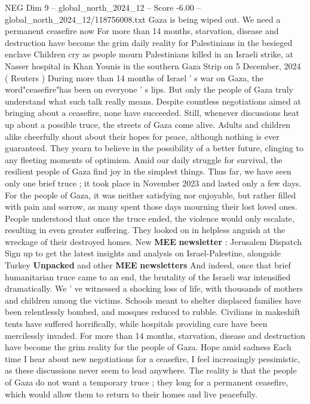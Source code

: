 \begin{textsample}{NEG Dim 9 – global\_north\_2024\_12 – Score -6.00 – global\_north\_2024\_12/118756008.txt}  \label{ex:f9_neg_122}
Gaza is being wiped out.
We need a permanent ceasefire now For more than 14 months, starvation, disease and destruction have become the grim daily reality for Palestinians in the besieged enclave Children cry as people mourn Palestinians killed in an Israeli strike, at Nasser hospital in Khan Younis in the southern Gaza Strip on 5 December, 2024 ( Reuters ) During more than 14 months of Israel ' s war on Gaza, the word"ceasefire"has been on everyone ' s lips.
But only the people of Gaza truly understand what such talk really means.
Despite countless negotiations aimed at bringing about a ceasefire, none have succeeded.
Still, whenever discussions heat up about a possible truce, the streets of Gaza come alive.
Adults and children alike cheerfully shout about their hopes for peace, although nothing is ever guaranteed.
They yearn to believe in the possibility of a better future, clinging to any fleeting moments of optimism.
Amid our daily struggle for survival, the resilient people of Gaza find joy in the simplest things.
Thus far, we have seen only one brief truce ; it took place in November 2023 and lasted only a few days.
For the people of Gaza, it was neither satisfying nor enjoyable, but rather filled with pain and sorrow, as many spent those days mourning their lost loved ones.
People understood that once the truce ended, the violence would only escalate, resulting in even greater suffering.
They looked on in helpless anguish at the wreckage of their destroyed homes.
New \textbf{MEE} \textbf{newsletter} : Jerusalem Dispatch Sign up to get the latest insights and analysis on Israel-Palestine, alongside Turkey \textbf{Unpacked} and other \textbf{MEE} \textbf{newsletters} And indeed, once that brief humanitarian truce came to an end, the brutality of the Israeli war intensified dramatically.
We ' ve witnessed a shocking loss of life, with thousands of mothers and children among the victims.
Schools meant to shelter displaced families have been relentlessly bombed, and mosques reduced to rubble.
Civilians in makeshift tents have suffered horrifically, while hospitals providing care have been mercilessly invaded.
For more than 14 months, starvation, disease and destruction have become the grim reality for the people of Gaza.
Hope amid sadness Each time I hear about new negotiations for a ceasefire, I feel increasingly pessimistic, as these discussions never seem to lead anywhere.
The reality is that the people of Gaza do not want a temporary truce ; they long for a permanent ceasefire, which would allow them to return to their homes and live peacefully.

\end{textsample}
